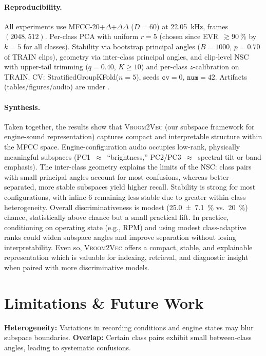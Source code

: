 \documentclass[11pt]{article}
\begin{document}
\paragraph{Reproducibility.}
All experiments use MFCC-20+$\Delta$+$\Delta\Delta$ ($D=60$) at \SI{22.05}{kHz}, frames $(2048,512)$. 
Per-class PCA with uniform $r=5$ (chosen since EVR~$\gtrsim\SI{90}{\percent}$ by $k=5$ for all classes). 
Stability via bootstrap principal angles ($B=1000$, $p=0.70$ of TRAIN clips), geometry via inter-class principal angles, and clip-level \textsc{NSC} with upper-tail trimming ($q=0.40$, $K\ge10$) and per-class $z$-calibration on TRAIN. 
CV: StratifiedGroupKFold($n{=}5$), seeds $\texttt{cv}=0$, $\texttt{num}=42$. 
Artifacts (tables/figures/audio) are under .

\paragraph{Synthesis.}
Taken together, the results show that \textsc{Vroom2Vec} (our subspace framework for engine-sound representation) captures compact and interpretable structure within the MFCC space. Engine-configuration audio occupies low-rank, physically meaningful subspaces (PC1~$\approx$~“brightness,” PC2/PC3~$\approx$~spectral tilt or band emphasis). The inter-class geometry explains the limits of the \textsc{NSC}: class pairs with small principal angles account for most confusions, whereas better-separated, more stable subspaces yield higher recall. Stability is strong for most configurations, with inline-6 remaining less stable due to greater within-class heterogeneity. Overall discriminativeness is modest (\SI{25.0 \pm 7.1}{\percent} vs.\ \SI{20}{\percent}) chance, statistically above chance but a small practical lift. In practice, conditioning on operating state (e.g., RPM) and using modest class-adaptive ranks could widen subspace angles and improve separation without losing interpretability. Even so, \textsc{Vroom2Vec} offers a compact, stable, and explainable representation which is valuable for indexing, retrieval, and diagnostic insight when paired with more discriminative models.


\section{Limitations \& Future Work}

\textbf{Heterogeneity:} Variations in recording conditions and engine states may blur subspace boundaries.  
\textbf{Overlap:} Certain class pairs exhibit small between-class angles, leading to systematic confusions.
\end{document}
